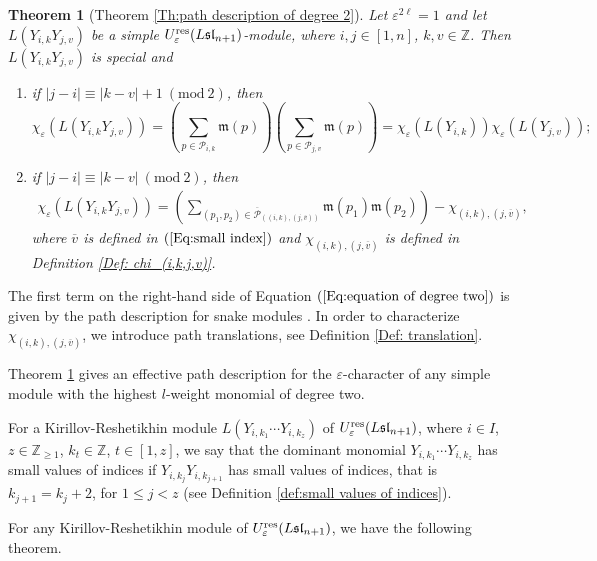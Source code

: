 \documentclass[12pt, reqno]{amsart}
\newtheorem{theorem}{Theorem}[section]
\numberwithin{equation}{section}
\newcommand{\ZZ}{\mathbb{Z}}
\newcommand{\res}{{\rm res}}
\begin{document}
\begin{theorem}[Theorem \ref{Th:path description of degree 2}]\label{thm: introduction path description of module with highest monomial degree 2}
Let $\varepsilon^{2 \ell}=1$ and let $L(Y_{i,k}Y_{j,v})$ be a simple $U_{\varepsilon}^{\res}({L\mathfrak{sl}_{n+1}})$-module, where $i, j \in [1,n]$, $k, v \in \ZZ$. Then $L(Y_{i,k}Y_{j,v})$ is special and
\begin{enumerate}
\item if $|j-i|\equiv |k-v|+1\ (\text{mod}\ 2)$, then
\[
\chi_{\varepsilon}(L(Y_{i,k}Y_{j,v}))=\left(\sum_{p \in \mathscr{P}_{i,k}} \mathfrak{m}(p)\right) \left(\sum_{p \in \mathscr{P}_{j,v}} \mathfrak{m}(p)\right)=\chi_{\varepsilon}(L(Y_{i,k}))\chi_{\varepsilon}(L(Y_{j,v}));
\]
\item if $|j-i|\equiv |k-v|\ (\text{mod}\ 2)$, then
\begin{align}\label{Eq:equation of degree two}
\chi_{\varepsilon}(L(Y_{i,k}Y_{j,v}))=\left(\sum_{(p_{1},p_{2}) \in \overline{\mathscr{P}}_{((i,k),(j,\overline{v}))}} \mathfrak{m}(p_1)\mathfrak{m}(p_2)\right)-\chi_{(i,k), (j,\overline{v})},
 \end{align}
where $\overline{v}$ is defined in $(\ref{Eq:small index})$ and $\chi_{(i,k), (j,\overline{v})}$ is defined in Definition \ref{Def: chi_(i,k,j,v)}. 
\end{enumerate}
\end{theorem}

The first term on the right-hand side of Equation $(\ref{Eq:equation of degree two})$ is given by the path description for snake modules \cite{MY12a}. In order to characterize $\chi_{(i,k), (j,\overline{v})}$, we introduce path translations, see Definition \ref{Def: translation}.

Theorem \ref{thm: introduction path description of module with highest monomial degree 2} gives an effective path description for the $\varepsilon$-character of any simple module with the highest $l$-weight monomial of degree two.


For a Kirillov-Reshetikhin module $L(Y_{i,k_1}\cdots Y_{i,k_z})$ of $U_{\varepsilon}^{\res}({L\mathfrak{sl}_{n+1}})$, where $i\in I$, $z \in\ZZ_{\geq 1}$, $k_t \in \ZZ$, $t \in [1,z]$, we say that the dominant monomial $Y_{i,k_1}\cdots Y_{i,k_z}$ has small values of indices if $Y_{i,k_j}Y_{i,k_{j+1}}$ has small values of indices, that is $k_{j+1}=k_{j}+2$, for $1\leq j<z$ (see Definition \ref{def:small values of indices}).


For any Kirillov-Reshetikhin module of $U_{\varepsilon}^{\res}({L\mathfrak{sl}_{n+1}})$, we have the following theorem.
\end{document}
